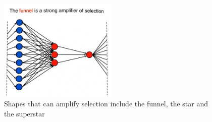 \documentclass[]{final_report}
\begin{document}
\begin{figure}	\center
	\includegraphics[width=0.5\textwidth]{funnel_amplifier.jpg}
	\caption{Shapes that can amplify selection include the funnel, the star and the superstar~\cite{nowak2006evolutionary}}
	\label{fig:funnel}
\end{figure}
\end{document}
